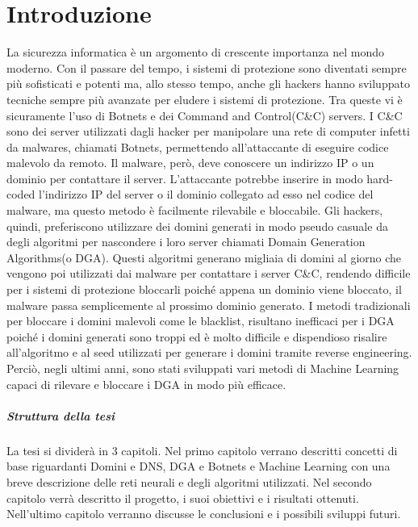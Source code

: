 \documentclass[12pt,a4paper,openright,twoside]{book}
\begin{document}
\mainmatter

\chapter{Introduzione}
\label{chap:introduction}

La sicurezza informatica è un argomento di crescente importanza
nel mondo moderno. Con il passare del tempo,
i sistemi di protezione sono diventati sempre più sofisticati
e potenti ma, allo stesso tempo, anche gli hackers 
hanno sviluppato tecniche sempre più avanzate per eludere i sistemi di protezione.
Tra queste vi è sicuramente l'uso di Botnets e
dei Command and Control(C\&C) servers. I C\&C sono dei server utilizzati dagli hacker per manipolare
una rete di computer infetti da malwares, chiamati Botnets, permettendo
all'attaccante di eseguire codice malevolo da remoto.
Il malware, però, deve conoscere un indirizzo IP o un dominio
per contattare il server. L'attaccante potrebbe
inserire in modo hard-coded l'indirizzo IP del server o il dominio collegato ad esso nel codice del malware,
ma questo metodo è facilmente rilevabile e bloccabile.
Gli hackers, quindi, preferiscono utilizzare dei domini
generati in modo pseudo casuale da degli algoritmi per nascondere i loro server chiamati
Domain Generation Algorithms(o DGA).
Questi algoritmi generano migliaia di domini al giorno
che vengono poi utilizzati dai malware per contattare i server C\&C,
rendendo difficile per i sistemi di protezione bloccarli
poiché appena un dominio viene bloccato, il malware passa semplicemente al prossimo dominio generato.
I metodi tradizionali per bloccare i domini malevoli come le blacklist,
risultano inefficaci per i DGA poiché i domini generati sono troppi
ed è molto difficile e dispendioso risalire all'algoritmo e al seed utilizzati per generare i domini
tramite reverse engineering.
Perciò, negli ultimi anni, sono stati sviluppati vari metodi di Machine Learning
capaci di rilevare e bloccare i DGA in modo più efficace. \vfill
\paragraph{Struttura della tesi}
La tesi si dividerà in 3 capitoli. Nel primo
capitolo verrano descritti concetti di base riguardanti Domini e DNS, DGA e Botnets
e Machine Learning con una breve descrizione delle reti neurali e degli
algoritmi utilizzati. Nel secondo capitolo verrà descritto il progetto,
i suoi obiettivi e i risultati ottenuti. Nell'ultimo capitolo
verranno discusse le conclusioni e i possibili sviluppi futuri.
\end{document}
